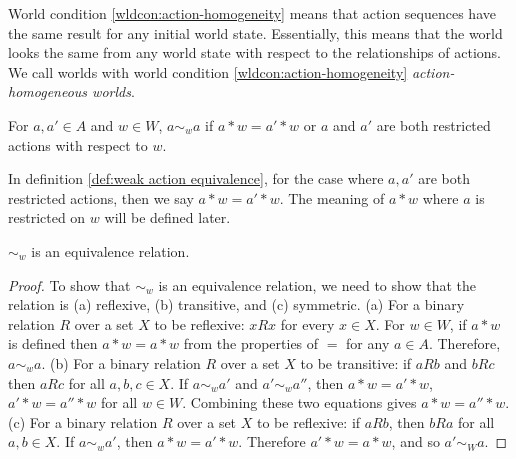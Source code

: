 World condition \ref{wldcon:action-homogeneity} means that action sequences have the same result for any initial world state.
Essentially, this means that the world looks the same from any world state with respect to the relationships of actions.
We call worlds with world condition \ref{wldcon:action-homogeneity} \textit{action-homogeneous worlds}.

\begin{definition}\label{def:weak action equivalence}
	For $a,a' \in A$ and $w \in W$, $a \sim_{w} a$ if $a * w = a' * w$ or $a$ and $a'$ are both restricted actions with respect to $w$.
\end{definition}

\begin{remark}
	In definition \ref{def:weak action equivalence}, for the case where $a, a'$ are both restricted actions, then we say $a * w = a' * w$.
	The meaning of $a * w$ where $a$ is restricted on $w$ will be defined later.
\end{remark}

\begin{proposition}
	$\sim_{w}$ is an equivalence relation.
\end{proposition}
\begin{proof}
	To show that $\sim_{w}$ is an equivalence relation, we need to show that the relation is (a) reflexive, (b) transitive, and (c) symmetric.
	(a) For a binary relation $R$ over a set $X$ to be reflexive: $x R x$ for every $x \in X$.
	For $w \in W$, if $a * w$ is defined then $a * w = a * w$ from the properties of $=$ for any $a \in A$.
	Therefore, $a \sim_{w} a$.
	(b) For a binary relation $R$ over a set $X$ to be transitive: if $a R b$ and $b R c$ then $a R c$ for all $a,b,c \in X$.
	If $a \sim_{w} a'$ and $a' \sim_{w} a''$, then $a * w = a' * w$, $a' * w = a'' * w$ for all $w \in W$.
	Combining these two equations gives $a * w = a'' * w$.
	(c) For a binary relation $R$ over a set $X$ to be reflexive: if $a R b$, then $b R a$ for all $a,b \in X$.
	If $a \sim_{w} a'$, then $a * w = a' * w$. Therefore $a' * w = a * w$, and so $a' \sim_{W} a$.
\end{proof}

